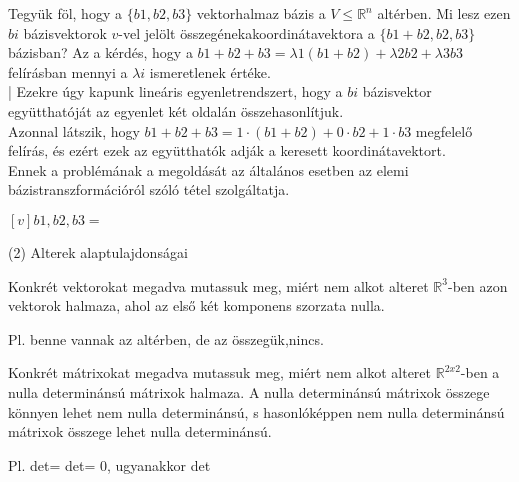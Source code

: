 \begin{frame}
  \begin{tcolorbox}[title={1/4. -Q-}]
      Tegyük föl, hogy a $\{b1,b2,b3\}$ vektorhalmaz bázis a $V ≤ \mathbb{R}^n$ altérben. Mi lesz ezen $bi$ bázisvektorok $v$-vel jelölt összegénekakoordinátavektora a $\{b1+b2,b2,b3\}$ bázisban?
  \tcblower
    Az a kérdés, hogy a $b1+b2+b3 = {\lambda}1(b1+b2)+{\lambda}2b2+{\lambda}3b3$ felírásban mennyi a ${\lambda}i$ ismeretlenek értéke.\\|
      Ezekre úgy kapunk lineáris egyenletrendszert, hogy a $bi$ bázisvektor együtthatóját az egyenlet két oldalán összehasonlítjuk.\\
      
      Azonnal látszik, hogy $b1 + b2 + b3 = 1 \cdot (b1 + b2) + 0 \cdot b2 + 1 \cdot b3$ megfelelő felírás, és ezért ezek az együtthatók adják a keresett koordinátavektort.\\
      
      Ennek a problémának a megoldását az általános esetben az elemi bázistranszformációról szóló tétel szolgáltatja.
      
   $[v]b1,b2,b3 =$ 
  \end{tcolorbox}
\end{frame}  

\begin{frame}[plain]
\begin{tcolorbox}[center, colback={myyellow}, coltext={black}, colframe={myyellow}]
    {\RHuge  (2) Alterek alaptulajdonságai}
    \mmedskip
\end{tcolorbox}
\end{frame}

\begin{frame}
  \begin{tcolorbox}[title={2/1. -R-}]
      Konkrét vektorokat megadva mutassuk meg, miért nem alkot alteret $\mathbb{R}^3$-ben azon vektorok halmaza, ahol az első két komponens szorzata nulla. 
  \tcblower

    \mmedskip 
  
   Pl. benne vannak az altérben, de az összegük,nincs.
  \end{tcolorbox}
\end{frame}


\begin{frame}
  \begin{tcolorbox}[title={2/2. -Q-}]
      Konkrét mátrixokat megadva mutassuk meg, miért nem alkot alteret $\mathbb{R}^{2 x 2}$-ben a nulla determinánsú mátrixok halmaza. 
  \tcblower
    A nulla determinánsú mátrixok összege könnyen lehet nem nulla determinánsú, s hasonlóképpen nem nulla determinánsú mátrixok összege lehet nulla determinánsú.\\
    \mmedskip 
  
    Pl. det= det= 0, ugyanakkor det
  \end{tcolorbox}
\end{frame}

